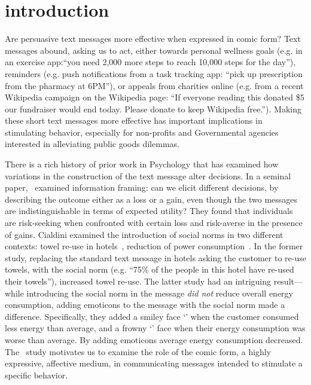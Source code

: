 \section{introduction}
\label{sec:introduction}
Are persuasive text messages more effective when expressed in comic form? Text messages abound, asking us to act, either towards personal wellness goals (e.g. in an exercise app:``you need 2,000 more steps to reach 10,000 steps for the day''), reminders (e.g. push notifications from a task tracking app: ``pick up prescription from the pharmacy at 6PM''), or appeals from charities online (e.g. from a recent Wikipedia campaign on the Wikipedia page: ``If everyone reading this donated \$5 our fundraiser would end today. Please donate to keep Wikipedia free.''). Making these short text messages more effective has important implications in stimulating behavior, especially for non-profits and Governmental agencies interested in alleviating public goods dilemmas.

There is a rich history of prior work in Psychology that has examined how variations in the construction of the text message alter decisions. In a seminal paper,~\textcite{tversky1981framing} examined information framing: can we elicit different decisions, by describing the outcome either as a loss or a gain, even though the two messages are indistinguishable in terms of expected utility? They found that individuals are risk-seeking when confronted with certain loss and risk-averse in the presence of gains. Cialdini examined the introduction of social norms in two different contexts: towel re-use in hotels~\parencite{goldstein2008room}, reduction of power consumption~\parencite{schultz2007constructive}. In the former study, replacing the standard text message in hotels asking the customer to re-use towels, with the social norm (e.g. ``75\% of the people in this hotel have re-used their towels''), increased towel re-use. The latter study had an intriguing result---while introducing the social norm in the message \textit{did not} reduce overall energy consumption, adding emoticons to the message with the social norm made a difference. Specifically, they added a smiley face `\smiley{}' when the customer consumed less energy than average, and a frowny `\frownie{}' face when their energy consumption was worse than average. By adding emoticons average energy consumption decreased. The~\textcite{schultz2007constructive} study motivates us to examine the role of the comic form, a highly expressive, affective medium, in communicating messages intended to stimulate a specific behavior.

